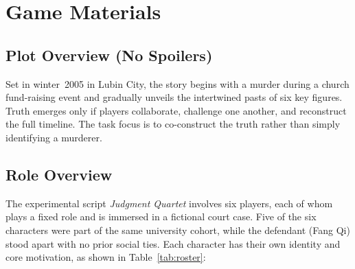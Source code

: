 \documentclass[sigconf,screen]{acmart-tagged}
\begin{document}

% 
% 


\appendix

\section{Game Materials}
\label{judgment quartet}
\subsection{Plot Overview (No Spoilers)}
\label{plot overview}
Set in winter~2005 in Lubin City, the story begins with a murder during a church fund-raising event and gradually unveils the intertwined pasts of six key figures. Truth emerges only if players collaborate, challenge one another, and reconstruct the full timeline. The task focus is to co-construct the truth rather than simply identifying a murderer.


\subsection{Role Overview}
\label{role overview}
The experimental script \emph{Judgment Quartet} involves six players, each of whom plays a fixed role and is immersed in a fictional court case. Five of the six characters were part of the same university cohort, while the defendant (Fang Qi) stood apart with no prior social ties. Each character has their own identity and core motivation, as shown in Table~\ref{tab:roster}:
\end{document}
